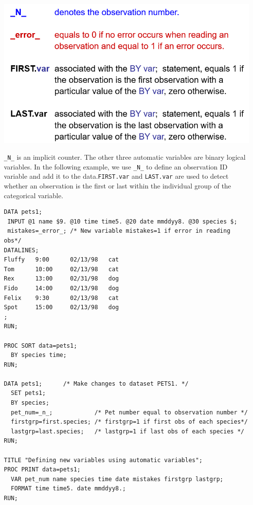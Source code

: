 \documentclass[
]{book}
\begin{document}
\begin{center}\includegraphics[width=1\linewidth]{img09/w09-4autoVar} \end{center}

\texttt{\_N\_} is an implicit counter. The other three automatic variables are binary logical variables. In the following example, we use \texttt{\_N\_} to define an observation ID variable and add it to the data.\texttt{FIRST.var} and \texttt{LAST.var} are used to detect whether an observation is the first or last within the individual group of the categorical variable.

\begin{verbatim}
DATA pets1;
 INPUT @1 name $9. @10 time time5. @20 date mmddyy8. @30 species $;
 mistakes=_error_; /* New variable mistakes=1 if error in reading obs*/
DATALINES;
Fluffy   9:00      02/13/98   cat
Tom      10:00     02/13/98   cat
Rex      13:00     02/31/98   dog
Fido     14:00     02/13/98   dog
Felix    9:30      02/13/98   cat
Spot     15:00     02/13/98   dog
;
RUN;

PROC SORT data=pets1;
  BY species time;
RUN;

DATA pets1;      /* Make changes to dataset PETS1. */
  SET pets1;
  BY species;
  pet_num=_n_;            /* Pet number equal to observation number */
  firstgrp=first.species; /* firstgrp=1 if first obs of each species*/
  lastgrp=last.species;   /* lastgrp=1 if last obs of each species */
RUN;

TITLE "Defining new variables using automatic variables";
PROC PRINT data=pets1;
  VAR pet_num name species time date mistakes firstgrp lastgrp;
  FORMAT time time5. date mmddyy8.;
RUN;
\end{verbatim}
\end{document}
